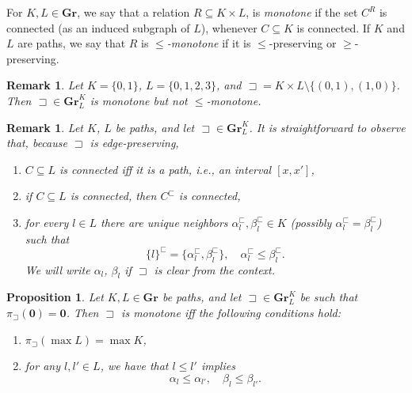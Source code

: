 \documentclass[12pt]{amsart}
\numberwithin{equation}{section}
\theoremstyle{plain}
\newtheorem{remark}[theorem]{\bf Remark}
\newtheorem{proposition}[theorem]{\bf Proposition}
\theoremstyle{definition}
\newcommand \sqsp{\sqsupset}
\newcommand \sqsb{\sqsubset}
\newcommand \rt{\mathbf{0}}
\newcommand \GGRb{\mathbf{Gr}}
\begin{document}
For $K, L \in \GGRb$, we say that a relation $R \subseteq K \times L$, is \emph{monotone} if the set $C^R$ is connected (as an induced subgraph of $L$), whenever $C \subseteq K$ is connected. If $K$ and $L$ are paths, we say that $R$ is \emph{$\leq$-monotone} if it is $\leq $-preserving or $\geq $-preserving.  

\begin{remark}
Let $K=\{0,1\}$, $L=\{0,1,2, 3\}$, and $\sqsp= K \times L \setminus \{(0,1), (1,0)\}$. Then $\sqsp \in \GGRb^K_L$ is monotone but not $\leq$-monotone. 
\end{remark}

\begin{remark}
\label{re:ConnectedBasic}
Let $K$, $L$ be paths, and let $\sqsp \in \GGRb^K_L$. It is straightforward to observe that, because $\sqsp$ is edge-preserving,
%
\begin{enumerate}
	\item $C \subseteq L$ is connected iff it is a path, i.e., an interval $[x,x']$,
	\item if $C \subseteq L$ is connected, then $C^\sqsb$ is connected,
	\item for every $l \in L$ there are unique neighbors $\alpha^\sqsb_l, \beta^\sqsb_l \in K$ (possibly $\alpha^\sqsb_l= \beta^\sqsb_l$) such that $$\{l\}^\sqsb=\{\alpha^\sqsb_l, \beta^\sqsb_l\}, \quad \alpha^\sqsb_l \leq \beta^\sqsb_l.$$ We will write $\alpha_l$, $\beta_l$ if $\sqsp$ is clear from the context.
\end{enumerate}
\end{remark}
 

\begin{proposition}
	\label{pr:CharCMon}
	Let $K, L \in \GGRb$ be paths, and let $\sqsp \in \GGRb^K_L$ be such that $\pi_{\sqsp}(\rt)=\rt$. Then $\sqsp$ is monotone iff the following conditions hold:
	\begin{enumerate}
		\item $\pi_\sqsp(\max L)=\max K$,
		\item  for any $l,l' \in L$, we have that $l \leq l'$ implies $$\alpha_{l} \leq \alpha_{l'}, \quad \beta_{l} \leq \beta_{l'}.$$ 
	\end{enumerate}
\end{proposition} 
\end{document}
